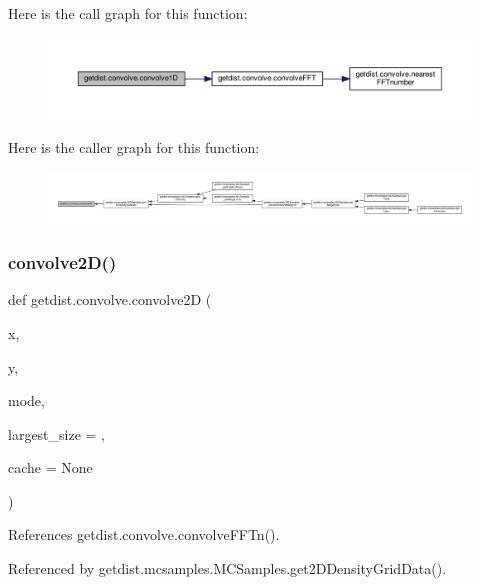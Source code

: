 Here is the call graph for this function\+:
\nopagebreak
\begin{figure}[H]
\begin{center}
\leavevmode
\includegraphics[width=350pt]{namespacegetdist_1_1convolve_afcf448b1f8993227af712ca2b0c8399c_cgraph}
\end{center}
\end{figure}
Here is the caller graph for this function\+:
\nopagebreak
\begin{figure}[H]
\begin{center}
\leavevmode
\includegraphics[width=350pt]{namespacegetdist_1_1convolve_afcf448b1f8993227af712ca2b0c8399c_icgraph}
\end{center}
\end{figure}
\mbox{\label{namespacegetdist_1_1convolve_a519469039fd4ef30511d804e47fe8f41}} 
\subsubsection{\texorpdfstring{convolve2\+D()}{convolve2D()}}
{\footnotesize\ttfamily def getdist.\+convolve.\+convolve2D (\begin{DoxyParamCaption}\item[{}]{x,  }\item[{}]{y,  }\item[{}]{mode,  }\item[{}]{largest\+\_\+size = {},  }\item[{}]{cache = {\ttfamily None} }\end{DoxyParamCaption})}



References getdist.\+convolve.\+convolve\+F\+F\+Tn().



Referenced by getdist.\+mcsamples.\+M\+C\+Samples.\+get2\+D\+Density\+Grid\+Data().

